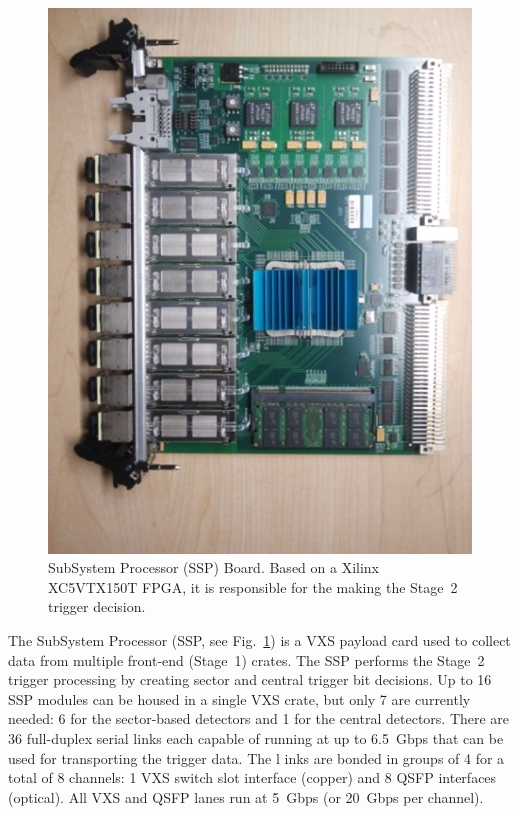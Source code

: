 \begin{figure}[hbt]
	\centering
	\includegraphics[width=1.0\columnwidth,keepaspectratio]{img/ssp_board.png}
	\caption{SubSystem Processor (SSP) Board. Based on a Xilinx XC5VTX150T FPGA, it is responsible for
          the making the Stage~2 trigger decision.}
	\label{fig:ssp_board}
\end{figure}

The SubSystem Processor (SSP, see Fig.~\ref{fig:ssp_board}) is a VXS payload card used to collect data
from multiple front-end (Stage~1) crates. The SSP performs the Stage~2 trigger processing by creating sector
and central trigger bit decisions. Up to 16 SSP modules can be housed in a single VXS crate, but only 7 are
currently needed: 6 for the sector-based detectors and 1 for the central detectors. There are 36 full-duplex
serial links each capable of running at up to 6.5~Gbps that can be used for transporting the trigger data. The l
inks are bonded in groups of 4 for a total of 8 channels: 1 VXS switch slot interface (copper) and 8 QSFP
interfaces (optical). All VXS and QSFP lanes run at 5~Gbps (or 20~Gbps per channel).

